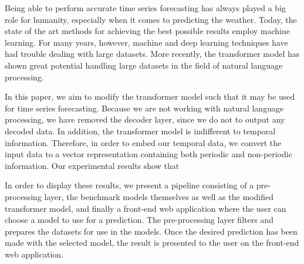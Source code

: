 Being able to perform accurate time series forecasting has always played a big role for humanity, especially when it comes to predicting the weather. 
Today, the state of the art methods for achieving the best possible results employ machine learning. 
For many years, however, machine and deep learning techniques have had trouble dealing with large datasets. 
More recently, the transformer model has shown great potential handling large datasets in the field of natural language processing.

In this paper, we aim to modify the transformer model such that it may be used for time series forecasting. 
Because we are not working with natural language processing, we have removed the decoder layer, since we do not to output any decoded data. 
In addition, the transformer model is indifferent to temporal information. 
Therefore, in order to embed our temporal data, we convert the input data to a vector representation containing both periodic and non-periodic information.
Our experimental results show that 

In order to display these results, we present a pipeline consisting of a pre-processing layer, the benchmark models themselves as well as the modified transformer model, and finally a front-end web application where the user can choose a model to use for a prediction.
The pre-processing layer filters and prepares the datasets for use in the models.
Once the desired prediction has been made with the selected model, the result is presented to the user on the front-end web application.